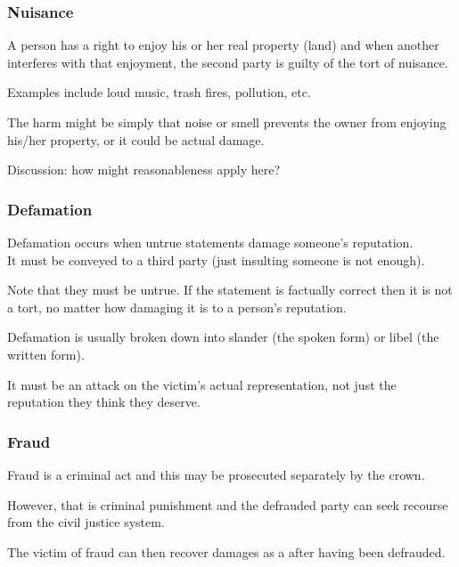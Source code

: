 \begin{frame}
\frametitle{Nuisance}

A person has a right to enjoy his or her real property (land) and when another interferes with that enjoyment, the second party is guilty of the tort of nuisance.

Examples include loud music, trash fires, pollution, etc.

The harm might be simply that noise or smell prevents the owner from enjoying his/her property, or it could be actual damage.

Discussion: how might reasonableness apply here?

\end{frame}


\begin{frame}
\frametitle{Defamation}

Defamation occurs when untrue statements damage someone's reputation.\\
\quad It must be conveyed to a third party (just insulting someone is not enough).

Note that they must be untrue. If the statement is factually correct then it is not a tort, no matter how damaging it is to a person's reputation.

Defamation is usually broken down into \alert{slander} (the spoken form) or \alert{libel} (the written form).

It must be an attack on the victim's actual representation, not just the reputation they think they deserve.

\end{frame}

\begin{frame}
\frametitle{Fraud}

Fraud is a criminal act and this may be prosecuted separately by the crown.

However, that is criminal punishment and the defrauded party can seek recourse from the civil justice system.

The victim of fraud can then recover damages as a after having been defrauded.

\end{frame}



